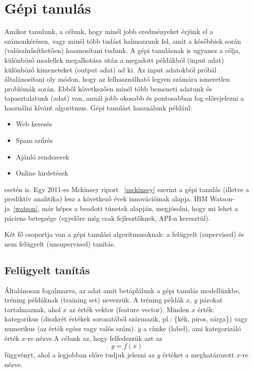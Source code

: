 \documentclass[a4paper,12pt]{article}
\begin{document}
\section{Gépi tanulás}

Amikor tanulunk, a célunk, hogy minél jobb eredményeket érjünk el a számonkérésen, vagy minél több tudást halmozzunk fel, amit a későbbiek során (valószínűsíthetően) hasznosítani tudunk. A gépi tanulásnak is ugyanez a célja, különböző modellek megalkotása után a megadott példákból (input adat) különböző kimeneteket (output adat) ad ki. Az input adatokból próbál általánosítani oly módon, hogy az felhasználható legyen számára ismeretlen problémák során. Ebből következően minél több bemeneti adatunk és tapasztalatunk (adat) van, annál jobb okosabb és pontosabban fog előrejelezni a használni kívánt algoritmus. Gépi tanulást használunk például: 
\begin{itemize}
\item Web keresés
\item Spam szűrés
\item Ajánló rendszerek
\item Online hirdetések
\end{itemize}
esetén is. 
Egy 2011-es Mckinsey riport ~\ref{mckinsey} szerint a gépi tanulás (illetve a prediktív analitika) lesz a következő évek innovációinak alapja. IBM Watson-ja~\ref{watson}, már képes a beadott tünetek alapján, megjósolni, hogy mi lehet a páciens betegsége (egyelőre még csak fejlesztőknek, API-n keresztül). \linebreak

Két fő csoportja van a gépi tanulási algoritmusoknak: a felügyelt (supervised) és nem felügyelt (unsupervised) tanítás.

\subsection{Felügyelt tanítás}

Általánosan fogalmazva, az adat amit betáplálunk a gépi tanulás modellünkbe, tréning példáknak (training set) nevezzük. A tréning példák $x$, $y$ párokat tartalmaznak, ahol $x$ az érték vektor (feature vector). Minden $x$ érték: kategorikus (diszkrét értékek sorozatából származik, pl.: \{kék, piros, sárga\}) vagy numerikus (az érték egész vagy valós szám). $y$ a címke (label), ami kategorizáló érték $x$-re nézve.A célunk az, hogy felfedezzük azt az 
\begin{equation*} y=f(x)
\end{equation*}
függvényt, ahol a legjobban előre tudjuk jelezni az $y$ értéket a meghatározott $x$-re nézve.
\end{document}
